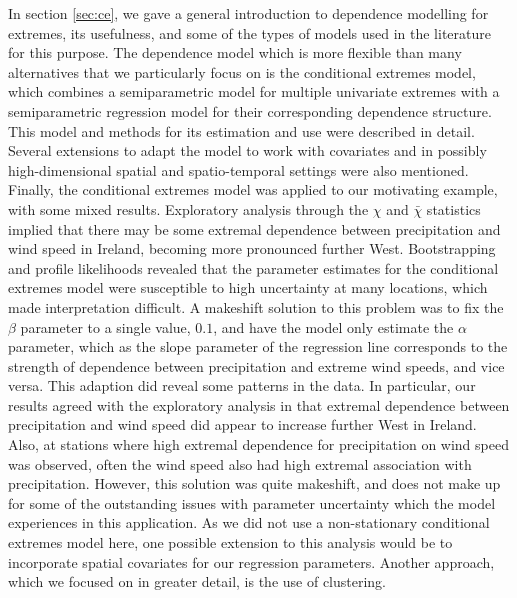 \documentclass{article}
\numberwithin{equation}{section}
\begin{document}
In section \ref{sec:ce}, we gave a general introduction to dependence modelling for extremes, its usefulness, and some of the types of models used in the literature for this purpose. 
The dependence model which is more flexible than many alternatives that we particularly focus on is the conditional extremes model, which combines a semiparametric model for multiple univariate extremes with a semiparametric regression model for their corresponding dependence structure.
This model and methods for its estimation and use were described in detail. 
Several extensions to adapt the model to work with covariates and in possibly high-dimensional spatial and spatio-temporal settings were also mentioned. 
Finally, the conditional extremes model was applied to our motivating example, with some mixed results. 
Exploratory analysis through the $\chi$ and $\bar{\chi}$ statistics implied that there may be some extremal dependence between precipitation and wind speed in Ireland, becoming more pronounced further West.
Bootstrapping and profile likelihoods revealed that the parameter estimates for the conditional extremes model were susceptible to high uncertainty at many locations, which made interpretation difficult. 
A makeshift solution to this problem was to fix the $\beta$ parameter to a single value, $0.1$, and have the model only estimate the $\alpha$ parameter, which as the slope parameter of the regression line corresponds to the strength of dependence between precipitation and extreme wind speeds, and vice versa.
This adaption did reveal some patterns in the data.
In particular, our results agreed with the exploratory analysis in that extremal dependence between precipitation and wind speed did appear to increase further West in Ireland. 
Also, at stations where high extremal dependence for precipitation on wind speed was observed, often the wind speed also had high extremal association with precipitation. 
However, this solution was quite makeshift, and does not make up for some of the outstanding issues with parameter uncertainty which the model experiences in this application. 
As we did not use a non-stationary conditional extremes model here, one possible extension to this analysis would be to incorporate spatial covariates for our regression parameters. 
Another approach, which we focused on in greater detail, is the use of clustering.
\end{document}
